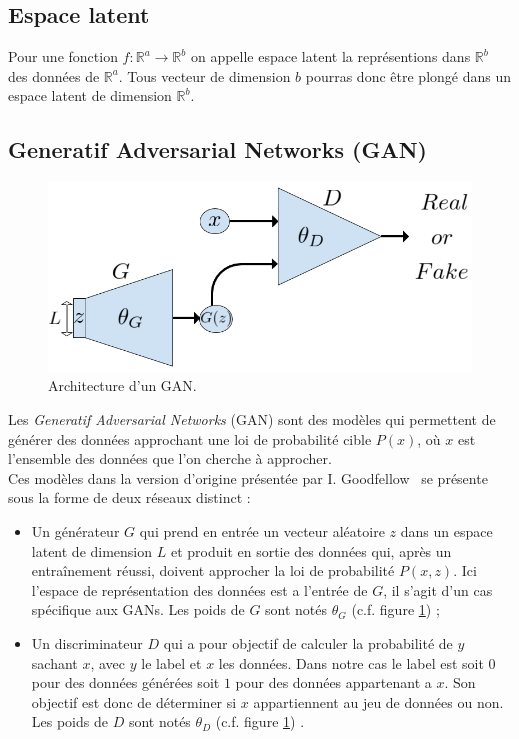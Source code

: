 \documentclass[11pt,francais]{article}
\begin{document}
\subsection{Espace latent}
Pour une fonction \(f : \mathbb{R}^a \rightarrow \mathbb{R}^b \) on appelle espace latent la représentions dans \(\mathbb{R}^b\) des données de \(\mathbb{R}^a\).
Tous vecteur de dimension \(b\) pourras donc être plongé dans un espace latent de dimension \(\mathbb{R}^b\).

\subsection{Generatif Adversarial Networks (GAN)}
\label{sec:GAN}
\begin{figure}[!h]
    \centering
    \includegraphics[width=\textwidth]{Figures/GAN/GAN_representation.png}
    \caption{Architecture d'un GAN.}
    \label{fig:fig9}
\end{figure}
Les \textit{Generatif Adversarial Networks} (GAN) sont des modèles qui permettent de générer des données approchant une loi de probabilité cible \(P(x)\), où \(x\) est l'ensemble des données que l'on cherche à approcher.\\
Ces modèles dans la version d'origine présentée par I. Goodfellow~\cite{NIPS2014_5423} se présente sous la forme de deux réseaux distinct : \\
\begin{itemize}
  \item Un générateur \(G\) qui prend en entrée un vecteur aléatoire \(z\) dans un espace latent de dimension \(L\) et produit en sortie des données qui, après un entraînement réussi, doivent approcher la loi de probabilité \(P(x,z)\). Ici l'espace de représentation des données est a l'entrée de \(G\), il s'agit d'un cas spécifique aux GANs. Les poids de \(G\) sont notés \(\theta_G\) (c.f. figure \ref{fig:fig9}) ;\\
  \item Un discriminateur \(D\) qui a pour objectif de calculer la probabilité de \(y\) sachant \(x\), avec \(y\) le label et \(x\) les données. Dans notre cas le label est soit \(0\) pour des données générées soit \(1\) pour des données appartenant a \(x\). Son objectif est donc de déterminer si \(x\) appartiennent au jeu de données ou non. Les poids de \(D\) sont notés \(\theta_D\) (c.f. figure \ref{fig:fig9}) .\\
\end{itemize}
\end{document}
